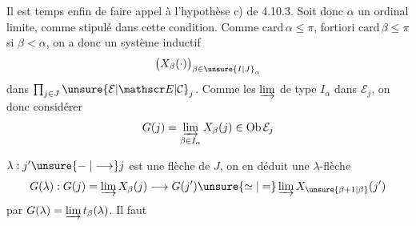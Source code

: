 Il est temps enfin de faire appel à l'hypothèse c) de 4.10.3. Soit donc $\alpha$ un ordinal limite, comme stipulé dans cette condition. Comme $\mathrm{card}\,\alpha\leq\pi$,  fortiori $\mathrm{card}\,\beta\leq\pi$ si $\beta<\alpha$, on a donc un système inductif
\[
 \bigl(X_\beta(\cdot)\bigr)_{\beta\in\unsure{I|J}_\alpha}
\]
dans $\prod_{j\in J}\unsure{\mathcal E|\mathscr E|\mathcal C}_j$. Comme les $\varinjlim$ de type $I_\alpha$  dans $\mathcal E_j$, on   donc considérer
\[
 G(j)=\varinjlim_{\beta\in I_\alpha}X_\beta(j)\in\operatorname{Ob}\mathcal E_j
\]

 $\lambda:j'\unsure{\mathrel{-}|\longrightarrow}j$ est une flèche de $J$, on en déduit une $\lambda$-flèche
\[
 G(\lambda):G(j)=\varinjlim X_\beta(j)\longrightarrow
 G(j')\unsure{\simeq|=}\varinjlim X_{\unsure{\beta+1|\beta}}(j')
\]
par $G(\lambda)=\varinjlim t_\beta(\lambda)$. Il faut
